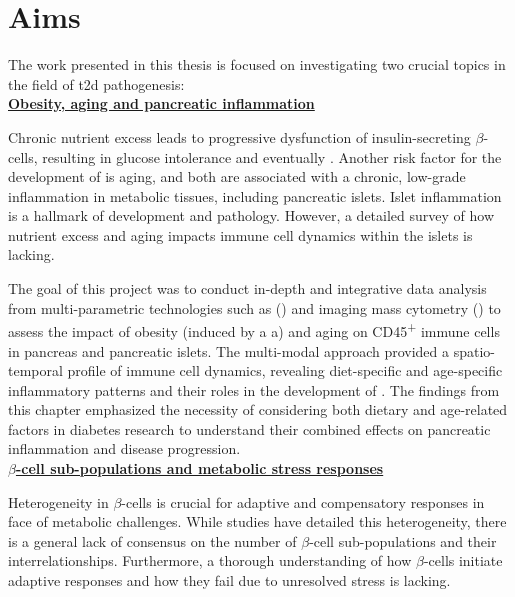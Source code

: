 \chapter{Aims}
\label{chp:aims}

\newpage\null\thispagestyle{empty}\newpage

\par The work presented in this thesis is focused on investigating two crucial topics in the field of \acrfull{t2d} pathogenesis:\\

\textbf{\underline{Obesity, aging and pancreatic inflammation}}
\vspace{15pt}
\par Chronic nutrient excess leads to progressive dysfunction of insulin-secreting $\beta$-cells, resulting in glucose intolerance and eventually . Another risk factor for the development of  is aging, and both are associated with a chronic, low-grade inflammation in metabolic tissues, including pancreatic islets. Islet inflammation is a hallmark of  development and pathology. However, a detailed survey of how nutrient excess and aging impacts immune cell dynamics within the islets is lacking.\\

\par The goal of this project was to conduct in-depth and integrative data analysis from multi-parametric technologies such as  () and imaging mass cytometry () to assess the impact of obesity (induced by a a) and aging on CD45\textsuperscript{+} immune cells in pancreas and pancreatic islets. The multi-modal approach provided a spatio-temporal profile of immune cell dynamics, revealing diet-specific and age-specific inflammatory patterns and their roles in the development of . The findings from this chapter emphasized the necessity of considering both dietary and age-related factors in diabetes research to understand their combined effects on pancreatic inflammation and disease progression.\\

\textbf{\underline{$\beta$-cell sub-populations and metabolic stress responses}}
\vspace{15pt}
\par Heterogeneity in $\beta$-cells is crucial for adaptive and compensatory responses in face of metabolic challenges. While  studies have detailed this heterogeneity, there is a general lack of consensus on the number of $\beta$-cell sub-populations and their interrelationships. Furthermore, a thorough understanding of how $\beta$-cells initiate adaptive responses and how they fail due to unresolved stress is lacking.\\

